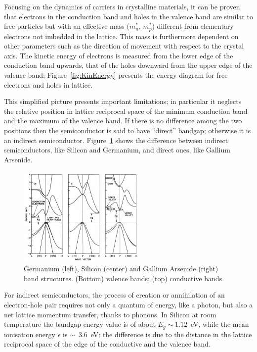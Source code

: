 Focusing on the dynamics of carriers in crystalline materials, it can be proven that  electrons in the 
conduction band and holes in the valence band are similar to free particles  but with an effective 
mass 
($m_n^*$, $m_p^*$) different from elementary electrons not imbedded in the lattice.
This mass is furthermore dependent on other parameters such as the direction of movement with 
respect to the crystal axis. The kinetic energy of electrons is measured from the lower edge of the 
conduction band upwards, that of the holes downward from the upper edge of the valence band; 
Figure~\ref{fig:KinEnergy} presents the energy diagram for free electrons and holes in lattice.

This simplified picture presents important limitations; in particular it neglects the relative position 
in lattice reciprocal space of the minimum conduction band and the maximum of the valence band. 
If there is no difference among the two positions then the semiconductor is said to have ``direct'' 
bandgap; otherwise it is an indirect semiconductor. Figure~\ref{fig:bandStructures} shows the difference 
between indirect semiconductors, like Silicon and Germanium, and direct ones, like Gallium Arsenide. 


 \begin{figure}[htbp]
   \centering
   \includegraphics[width=0.55\textwidth]{bandStructures.jpg} %
   \caption{\label{fig:bandStructures}Germanium (left), Silicon (center) and Gallium Arsenide (right) band structures. (Bottom) valence bands; (top) conductive bands.}
\end{figure}

For indirect semiconductors, the process of creation or annihilation of an electron-hole pair requires 
not only a quantum of energy, like a photon, but also a net lattice momentum transfer, thanks to 
phonons. In Silicon at room temperature the bandgap energy value is of about $E_g\sim1.12$~eV, 
while the mean ionisation energy $\epsilon$ is $\sim$~3.6~eV: the difference is due to the distance in the 
lattice reciprocal space of the edge of the conductive and the valence band. 

